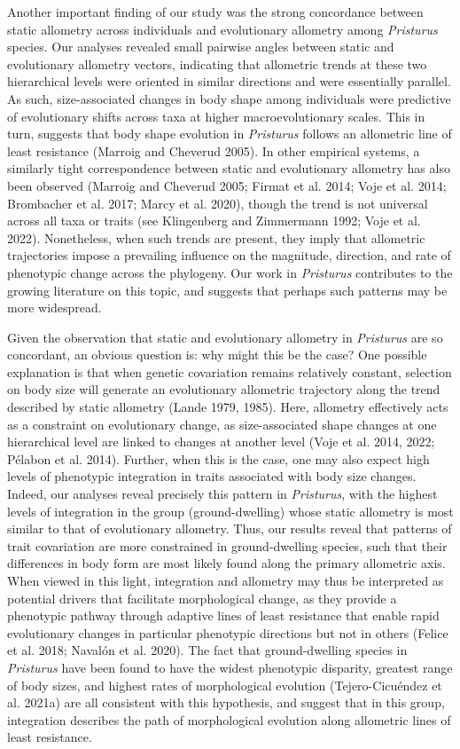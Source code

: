 \documentclass[
  11pt,
]{article}
\begin{document}
Another important finding of our study was the strong concordance
between static allometry across individuals and evolutionary allometry
among \emph{Pristurus} species. Our analyses revealed small pairwise
angles between static and evolutionary allometry vectors, indicating
that allometric trends at these two hierarchical levels were oriented in
similar directions and were essentially parallel. As such,
size-associated changes in body shape among individuals were predictive
of evolutionary shifts across taxa at higher macroevolutionary scales.
This in turn, suggests that body shape evolution in \emph{Pristurus}
follows an allometric line of least resistance (Marroig and Cheverud
2005). In other empirical systems, a similarly tight correspondence
between static and evolutionary allometry has also been observed
(Marroig and Cheverud 2005; Firmat et al. 2014; Voje et al. 2014;
Brombacher et al. 2017; Marcy et al. 2020), though the trend is not
universal across all taxa or traits (see Klingenberg and Zimmermann
1992; Voje et al. 2022). Nonetheless, when such trends are present, they
imply that allometric trajectories impose a prevailing influence on the
magnitude, direction, and rate of phenotypic change across the
phylogeny. Our work in \emph{Pristurus} contributes to the growing
literature on this topic, and suggests that perhaps such patterns may be
more widespread.\hfill\break

Given the observation that static and evolutionary allometry in
\emph{Pristurus} are so concordant, an obvious question is: why might
this be the case? One possible explanation is that when genetic
covariation remains relatively constant, selection on body size will
generate an evolutionary allometric trajectory along the trend described
by static allometry (Lande 1979, 1985). Here, allometry effectively acts
as a constraint on evolutionary change, as size-associated shape changes
at one hierarchical level are linked to changes at another level (Voje
et al. 2014, 2022; Pélabon et al. 2014). Further, when this is the case,
one may also expect high levels of phenotypic integration in traits
associated with body size changes. Indeed, our analyses reveal precisely
this pattern in \emph{Pristurus}, with the highest levels of integration
in the group (ground-dwelling) whose static allometry is most similar to
that of evolutionary allometry. Thus, our results reveal that patterns
of trait covariation are more constrained in ground-dwelling species,
such that their differences in body form are most likely found along the
primary allometric axis. When viewed in this light, integration and
allometry may thus be interpreted as potential drivers that facilitate
morphological change, as they provide a phenotypic pathway through
adaptive lines of least resistance that enable rapid evolutionary
changes in particular phenotypic directions but not in others (Felice et
al. 2018; Navalón et al. 2020). The fact that ground-dwelling species in
\emph{Pristurus} have been found to have the widest phenotypic
disparity, greatest range of body sizes, and highest rates of
morphological evolution (Tejero-Cicuéndez et al. 2021a) are all
consistent with this hypothesis, and suggest that in this group,
integration describes the path of morphological evolution along
allometric lines of least resistance. \hfill\break
\end{document}
